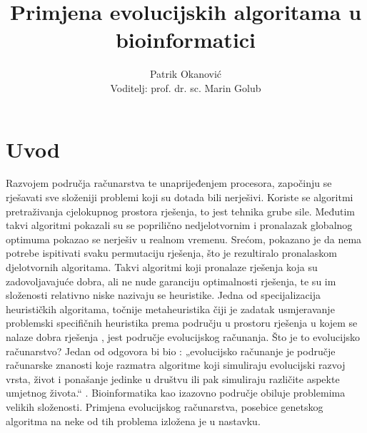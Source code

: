 \documentclass[times, utf8, zavrsni, numeric]{fer}
\begin{document}


\title{Primjena evolucijskih algoritama u bioinformatici}


\author{Patrik Okanović
\\Voditelj: prof. dr. sc. Marin Golub}


\maketitle

\izvornik

\zahvala{}

\tableofcontents

\chapter{Uvod} \label{uvod}
Razvojem područja računarstva te unaprijeđenjem procesora, započinju se rješavati sve složeniji problemi koji su dotada bili nerješivi. Koriste se algoritmi  pretraživanja cjelokupnog prostora rješenja, to jest tehnika grube sile. Međutim takvi algoritmi pokazali su se poprilično nedjelotvornim i pronalazak globalnog optimuma pokazao se nerješiv u realnom vremenu. Srećom, pokazano je da nema potrebe ispitivati svaku permutaciju rješenja, što je rezultiralo pronalaskom djelotvornih algoritama. Takvi algoritmi koji pronalaze rješenja koja su zadovoljavajuće dobra, ali ne nude garanciju optimalnosti rješenja, te su im složenosti relativno niske nazivaju se heuristike. Jedna od specijalizacija heurističkih algoritama, točnije metaheuristika čiji je zadatak usmjeravanje problemski specifičnih heuristika prema području u prostoru rješenja u kojem se nalaze dobra rješenja \cite{cupicMetaheuristike},  jest područje evolucijskog računanja. Što je to evolucijsko računarstvo? Jedan od odgovora bi bio : „evolucijsko računanje je područje računarske znanosti koje razmatra algoritme koji simuliraju evolucijski razvoj vrsta, život i ponašanje jedinke u društvu ili pak simuliraju različite aspekte umjetnog života.“ \cite{neizrazito}. Bioinformatika kao izazovno područje obiluje problemima velikih složenosti. Primjena evolucijskog računarstva, posebice genetskog algoritma na neke od tih problema izložena je u nastavku.\newline
\end{document}
